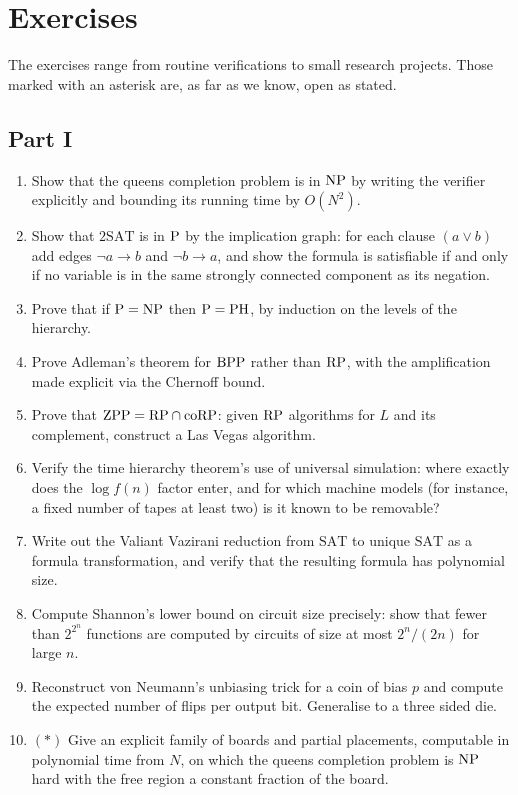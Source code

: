 \chapter{Exercises}
\label{app:exercises}

The exercises range from routine verifications to small research projects. Those marked with an asterisk are, as far as we know, open as stated.

\section*{Part I}

\begin{enumerate}
\item Show that the queens completion problem is in $\mathrm{NP}$ by writing the verifier explicitly and bounding its running time by $O(N^2)$.

\item Show that $2\mathrm{SAT}$ is in $\mathrm{P}$ by the implication graph: for each clause $(a \vee b)$ add edges $\neg a \to b$ and $\neg b \to a$, and show the formula is satisfiable if and only if no variable is in the same strongly connected component as its negation.

\item Prove that if $\mathrm{P} = \mathrm{NP}$ then $\mathrm{P} = \mathrm{PH}$, by induction on the levels of the hierarchy.

\item Prove Adleman's theorem for $\mathrm{BPP}$ rather than $\mathrm{RP}$, with the amplification made explicit via the Chernoff bound.

\item Prove that $\mathrm{ZPP} = \mathrm{RP} \cap \mathrm{coRP}$: given $\mathrm{RP}$ algorithms for $L$ and its complement, construct a Las Vegas algorithm.

\item Verify the time hierarchy theorem's use of universal simulation: where exactly does the $\log f(n)$ factor enter, and for which machine models (for instance, a fixed number of tapes at least two) is it known to be removable?

\item Write out the Valiant Vazirani reduction from $\mathrm{SAT}$ to unique $\mathrm{SAT}$ as a formula transformation, and verify that the resulting formula has polynomial size.

\item Compute Shannon's lower bound on circuit size precisely: show that fewer than $2^{2^n}$ functions are computed by circuits of size at most $2^n / (2n)$ for large $n$.

\item Reconstruct von Neumann's unbiasing trick for a coin of bias $p$ and compute the expected number of flips per output bit. Generalise to a three sided die.

\item $(*)$ Give an explicit family of boards and partial placements, computable in polynomial time from $N$, on which the queens completion problem is $\mathrm{NP}$ hard with the free region a constant fraction of the board.
\end{enumerate}

